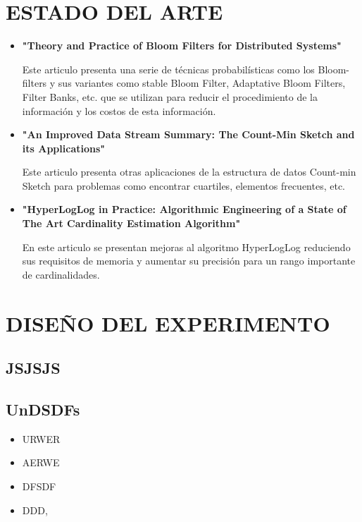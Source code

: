 \documentclass[journal]{IEEEtran}
\begin{document}
\section{ESTADO DEL ARTE}

\begin{itemize}

\item \textbf{"Theory and Practice of Bloom Filters for Distributed Systems"}

Este articulo presenta una serie de t\'ecnicas probabil\'isticas como los Bloom-filters y sus variantes como stable Bloom Filter, Adaptative Bloom Filters, Filter Banks, etc. que se utilizan para reducir el procedimiento de la informaci\'on y los costos de esta informaci\'on.\\

\item \textbf{"An Improved Data Stream Summary: The Count-Min Sketch and its Applications"}

Este articulo presenta otras aplicaciones de la estructura de datos Count-min Sketch para problemas como encontrar cuartiles, elementos frecuentes, etc.\\

\item \textbf{"HyperLogLog in Practice: Algorithmic Engineering of a State of The Art Cardinality Estimation Algorithm"}

En este articulo se presentan mejoras al algoritmo HyperLogLog reduciendo sus requisitos de memoria y aumentar su precisi\'on para un rango importante de cardinalidades.\\

\end{itemize}


\section{DISEÑO DEL EXPERIMENTO}


\subsection{JSJSJS}

\subsection{UnDSDFs}

\begin{itemize}

\item URWER 
\item AERWE
\item DFSDF
\item DDD, 

\end{itemize}
\end{document}
